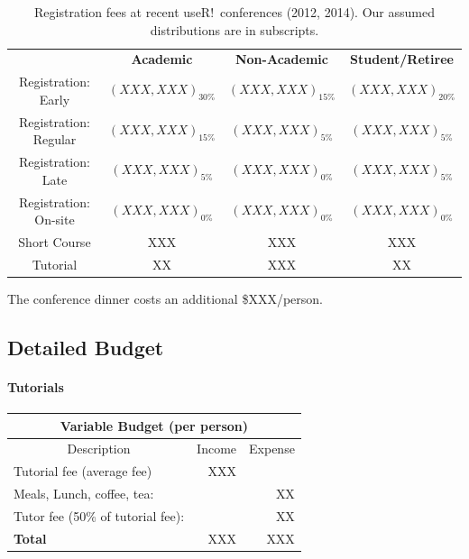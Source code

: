 \documentclass[11pt]{article}
\begin{document}
\begin{table}[bhtp]
  \begin{tabular}{cccc}
    &\multicolumn{1}{c}{\textbf{Academic}}
    &\multicolumn{1}{c}{\textbf{Non-Academic}}
    &\multicolumn{1}{c}{\textbf{Student/Retiree}}\\
    Registration: Early & $(XXX, XXX)_{30\%}$ & $(XXX, XXX)_{15\%}$ & $(XXX, XXX)_{20\%}$\\
    Registration: Regular & $(XXX, XXX)_{15\%}$ & $(XXX, XXX)_{5\%}$ & $(XXX, XXX)_{5\%}$\\
    Registration: Late & $(XXX, XXX)_{5\%}$ & $(XXX, XXX)_{0\%}$ & $(XXX, XXX)_{5\%}$\\
    Registration: On-site & $(XXX, XXX)_{0\%}$ & $(XXX, XXX)_{0\%}$ & $(XXX, XXX)_{0\%}$\\
    Short Course & XXX & XXX & XXX\\
    Tutorial & XX & XXX & XX\\
  \end{tabular}
  \caption{Registration fees at recent useR!~conferences (2012,
    2014). Our assumed distributions are in subscripts.}
  \label{table:regfees}
\end{table}

The conference dinner costs an additional \$XXX/person.

\subsection*{Detailed Budget}

\paragraph{Tutorials}
\begin{center}
\begin{tabular}{lrr}
  \multicolumn{3}{c}{\textbf{Variable Budget (per person)}}\\
  \hline
  \multicolumn{1}{c}{Description}
  &\multicolumn{1}{c}{Income}
  &\multicolumn{1}{c}{Expense}\\
  \hline
  Tutorial fee (average fee) &XXX\\
  Meals, Lunch, coffee, tea:        & &XX\\
  Tutor fee (50\% of tutorial fee):             & &XX\\
  \hline
  \textbf{Total}             &XXX &XXX\\
  \hline
\end{tabular}
\end{center}
\end{document}
